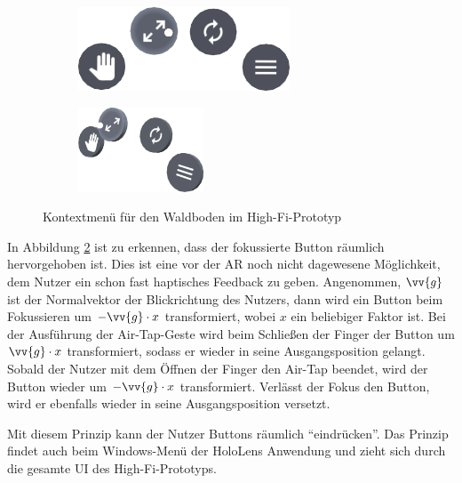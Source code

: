 \begin{figure}[htb]
  \centering
  \begin{subfigure}[b]{\fwidth}
    \centering
    \includegraphics[height=2.5cm]{figures/context-menu-front}
     \label{fig:context-menu-front}
  \end{subfigure}
  \begin{subfigure}[b]{\fwidth}
    \centering
  	\includegraphics[height=2.5cm]{figures/context-menu-side}
  	 \label{fig:context-menu-side}
  \end{subfigure}
  \caption{Kontextmenü für den Waldboden im High-Fi-Prototyp} \label{fig:context-menu}
\end{figure}

In Abbildung \ref{fig:context-menu-side} ist zu erkennen, dass der fokussierte Button räumlich hervorgehoben ist. Dies ist eine vor der AR noch nicht dagewesene Möglichkeit, dem Nutzer ein schon fast haptisches Feedback zu geben. Angenommen, $\vv{g}$ ist der Normalvektor der Blickrichtung des Nutzers, dann wird ein Button beim Fokussieren um $-\vv{g} \cdot x$ transformiert, wobei $x$ ein beliebiger Faktor ist. Bei der Ausführung der Air-Tap-Geste wird beim Schließen der Finger der Button um $\vv{g} \cdot x$ transformiert, sodass er wieder in seine Ausgangsposition gelangt. Sobald der Nutzer mit dem Öffnen der Finger den Air-Tap beendet, wird der Button wieder um $-\vv{g} \cdot x$ transformiert. Verlässt der Fokus den Button, wird er ebenfalls wieder in seine Ausgangsposition versetzt.

Mit diesem Prinzip kann der Nutzer Buttons räumlich "`eindrücken"'. Das Prinzip findet auch beim Windows-Menü der HoloLens Anwendung und zieht sich durch die gesamte UI des High-Fi-Prototyps.

